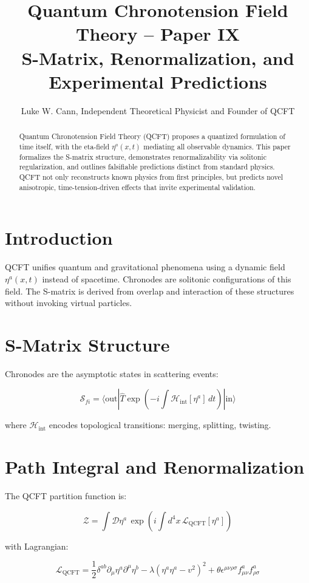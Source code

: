 \documentclass[12pt]{article}
\title{Quantum Chronotension Field Theory – Paper IX\\S-Matrix, Renormalization, and Experimental Predictions}
\author{Luke W. Cann, Independent Theoretical Physicist and Founder of QCFT}
\date{}
\begin{document}
\maketitle

\begin{abstract}
Quantum Chronotension Field Theory (QCFT) proposes a quantized formulation of time itself, with the eta-field $\eta^a(x,t)$ mediating all observable dynamics. This paper formalizes the S-matrix structure, demonstrates renormalizability via solitonic regularization, and outlines falsifiable predictions distinct from standard physics. QCFT not only reconstructs known physics from first principles, but predicts novel anisotropic, time-tension-driven effects that invite experimental validation.
\end{abstract}

\section{Introduction}

QCFT unifies quantum and gravitational phenomena using a dynamic field $\eta^a(x,t)$ instead of spacetime. Chronodes are solitonic configurations of this field. The S-matrix is derived from overlap and interaction of these structures without invoking virtual particles.

\section{S-Matrix Structure}

Chronodes are the asymptotic states in scattering events:

\[
\mathcal{S}_{fi} = \langle \text{out} | \hat{T} \exp\left( -i \int \mathcal{H}_{\text{int}}[\eta^a] \, dt \right) | \text{in} \rangle
\]

where $\mathcal{H}_{\text{int}}$ encodes topological transitions: merging, splitting, twisting.

\section{Path Integral and Renormalization}

The QCFT partition function is:

\[
\mathcal{Z} = \int \mathcal{D}\eta^a \, \exp\left(i \int d^4x \, \mathcal{L}_{\text{QCFT}}[\eta^a] \right)
\]

with Lagrangian:

\[
\mathcal{L}_{\text{QCFT}} = \frac{1}{2} \delta^{ab} \partial_\mu \eta^a \partial^\mu \eta^b - \lambda (\eta^a \eta^a - v^2)^2 + \theta \epsilon^{\mu\nu\rho\sigma} f_{\mu\nu}^a f_{\rho\sigma}^a
\]
\end{document}
